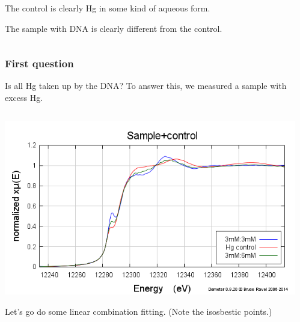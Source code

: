 \documentclass[10pt, xcolor=x11names, compress]{beamer}
\begin{document}
\begin{frame}
\begin{columns}
\begin{column}{0.6\linewidth}
      \bigskip

      The control is clearly Hg in some kind of aqueous form.

      \bigskip

      The sample with DNA is clearly different from the control.
    \end{column}
  \end{columns}
\end{frame}

\begin{frame}
  \frametitle{First question}
  \begin{exampleblock}{Is all Hg taken up by the DNA?}
    To answer this, we measured a sample with excess Hg.
  \end{exampleblock}
  \begin{columns}[T]
    \begin{column}{0.5\linewidth}
      \includegraphics[width=\linewidth]{images/excess.png}

      \medskip

      Let's go do some linear combination fitting.  (Note the
      isosbestic points.) 
    \end{column}
    \begin{column}{0.5\linewidth}
    \end{column}
  \end{columns}
\end{frame}
\end{document}
